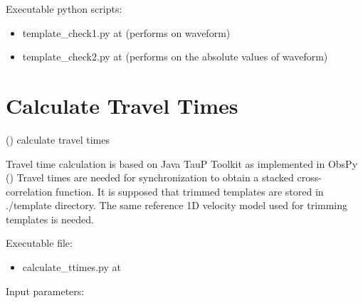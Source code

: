 \documentclass[a4paper,12pt,english]{sphinxmanual}
\let\sphinxpxdimen\pdfpxdimen\else\newdimen\sphinxpxdimen
\begin{document}
\noindent{\hspace*{\fill}\sphinxincludegraphics[width=400\sphinxpxdimen]{{good3}.png}\hspace*{\fill}}

Executable python scripts:
\begin{itemize}
\item {} 
template\_check1.py at  (performs on waveform)

\item {} 
template\_check2.py at  (performs on the absolute values of waveform)

\end{itemize}


\section{Calculate Travel Times}
\label{\detokenize{tutorial:calculate-travel-times}}
({\hyperref[\detokenize{sub/input.calculate_ttimes::doc}]{}}) calculate travel times

Travel time calculation is based on Java TauP Toolkit as implemented in ObsPy ()
Travel times are needed for synchronization to obtain a stacked cross-correlation function. It is supposed that trimmed templates
are stored in ./template directory. The same reference 1D velocity model used for trimming templates is needed.

Executable file:
\begin{itemize}
\item {} 
calculate\_ttimes.py at 

\end{itemize}

Input parameters:
\end{document}
